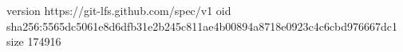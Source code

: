version https://git-lfs.github.com/spec/v1
oid sha256:5565dc5061e8d6dfb31e2b245c811ae4b00894a8718e0923c4c6cbd976667dc1
size 174916
